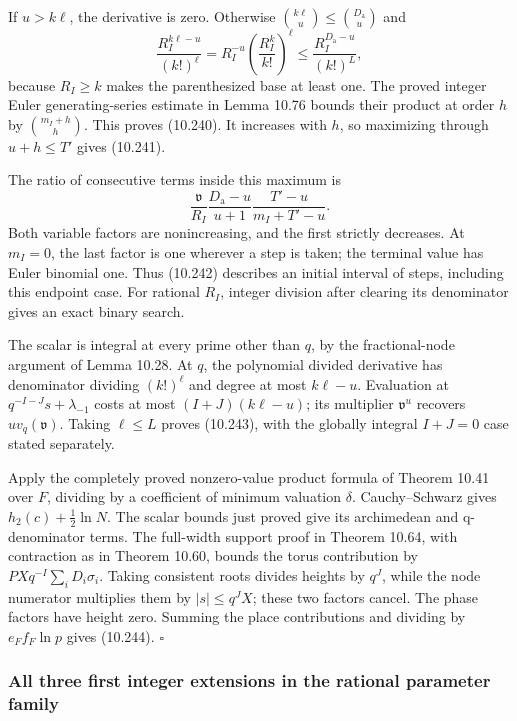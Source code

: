 \documentclass[
  11pt,
  a4paper,
]{article}
\begin{document}
If \(u>k\ell\), the derivative is zero. Otherwise
\(\binom{k\ell}u\le\binom{D_{\mathrm a}}u\) and \[
\frac{R_I^{k\ell-u}}{(k!)^\ell}
=R_I^{-u}\left(\frac{R_I^k}{k!}\right)^\ell
\le\frac{R_I^{D_{\mathrm a}-u}}{(k!)^L},
\] because \(R_I\ge k\) makes the parenthesized base at least one. The
proved integer Euler generating-series estimate in Lemma 10.76 bounds
their product at order \(h\) by \(\binom{m_I+h}h\). This proves
(10.240). It increases with \(h\), so maximizing through \(u+h\le T'\)
gives (10.241).

The ratio of consecutive terms inside this maximum is \[
\frac{\mathfrak v}{R_I}
\frac{D_{\mathrm a}-u}{u+1}
\frac{T'-u}{m_I+T'-u}.
\] Both variable factors are nonincreasing, and the first strictly
decreases. At \(m_I=0\), the last factor is one wherever a step is
taken; the terminal value has Euler binomial one. Thus (10.242)
describes an initial interval of steps, including this endpoint case.
For rational \(R_I\), integer division after clearing its denominator
gives an exact binary search.

The scalar is integral at every prime other than \(q\), by the
fractional-node argument of Lemma 10.28. At \(q\), the polynomial
divided derivative has denominator dividing \((k!)^\ell\) and degree at
most \(k\ell-u\). Evaluation at \(q^{-I-J}s+\lambda_{-1}\) costs at most
\((I+J)(k\ell-u)\); its multiplier \(\mathfrak v^u\) recovers
\(u v_q(\mathfrak v)\). Taking \(\ell\le L\) proves (10.243), with the
globally integral \(I+J=0\) case stated separately.

Apply the completely proved nonzero-value product formula of Theorem
10.41 over \(F\), dividing by a coefficient of minimum valuation
\(\delta\). Cauchy--Schwarz gives \(h_2(c)+\frac12\ln N\). The scalar
bounds just proved give its archimedean and q-denominator terms. The
full-width support proof in Theorem 10.64, with contraction as in
Theorem 10.60, bounds the torus contribution by
\(PXq^{-I}\sum_iD_i\sigma_i\). Taking consistent roots divides heights
by \(q^J\), while the node numerator multiplies them by \(|s|\le q^JX\);
these two factors cancel. The phase factors have height zero. Summing
the place contributions and dividing by \(e_Ff_F\ln p\) gives (10.244).
\(\square\)

\subsubsection{All three first integer extensions in the rational
parameter
family}\label{all-three-first-integer-extensions-in-the-rational-parameter-family}
\end{document}
